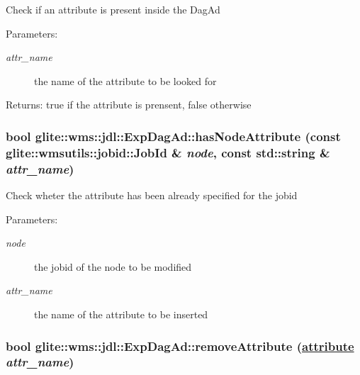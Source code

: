 Check if an attribute is present inside the Dag\-Ad \begin{Desc}
\item[Parameters:]
\begin{description}
\item[{\em attr\_\-name}]the name of the attribute to be looked for \end{description}
\end{Desc}
\begin{Desc}
\item[Returns:]true if the attribute is prensent, false otherwise \end{Desc}
\hypertarget{classglite_1_1wms_1_1jdl_1_1ExpDagAd_a8}{
\subsubsection[hasNodeAttribute]{\setlength{\rightskip}{0pt plus 5cm}bool glite::wms::jdl::Exp\-Dag\-Ad::has\-Node\-Attribute (const glite::wmsutils::jobid::Job\-Id \& {\em node}, const std::string \& {\em attr\_\-name})}}
\label{classglite_1_1wms_1_1jdl_1_1ExpDagAd_a8}


Check wheter the attribute has been already specified for the jobid \begin{Desc}
\item[Parameters:]
\begin{description}
\item[{\em node}]the jobid of the node to be modified \item[{\em attr\_\-name}]the name of the attribute to be inserted \end{description}
\end{Desc}
\hypertarget{classglite_1_1wms_1_1jdl_1_1ExpDagAd_a17}{
\subsubsection[removeAttribute]{\setlength{\rightskip}{0pt plus 5cm}bool glite::wms::jdl::Exp\-Dag\-Ad::remove\-Attribute (\hyperlink{classglite_1_1wms_1_1jdl_1_1ExpDagAd_w10}{attribute} {\em attr\_\-name})}}
\label{classglite_1_1wms_1_1jdl_1_1ExpDagAd_a17}


